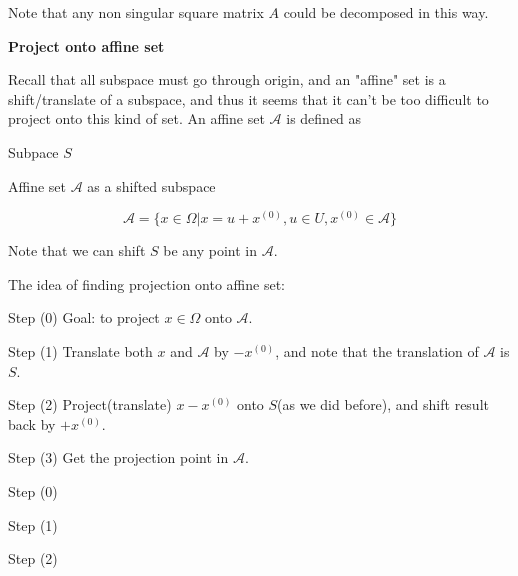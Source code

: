 Note that any non singular square matrix $A$ could be decomposed in this way.

\vspace{0.5cm}
\textbf{Project onto affine set}

Recall that all subspace must go through origin, and an "affine" set is a shift/translate of a subspace, and thus it seems that it can't be too difficult to project onto this kind of set. An affine set $\mathcal{A}$ is defined as

\begin{marginfigure}
	\centering
	\resizebox{7.5cm}{3cm}{}
	\caption{Subpace $S$}
	\label{}
\end{marginfigure}

\begin{marginfigure}
	\centering
	\resizebox{7.5cm}{3cm}{}
	\caption{Affine set $\mathcal{A}$ as a shifted subspace}
	\label{}
\end{marginfigure}

$$\mathcal{A}=\{x\in\Omega|x=u+x^{(0)}, u\in U, x^{(0)}\in \mathcal{A}\}$$

Note that we can shift $S$ be any point in $\mathcal{A}$.

\vspace{0.3cm}
The idea of finding projection onto affine set:

Step (0) Goal: to project $x\in \Omega$ onto $\mathcal{A}$.

Step (1) Translate both $x$ and $\mathcal{A}$ by $-x^{(0)}$, and note that the translation of $\mathcal{A}$ is $S$.

Step (2) Project(translate) $x-x^{(0)}$ onto $S$(as we did before), and shift result back by $+x^{(0)}$.

Step (3) Get the projection point in $\mathcal{A}$.

\begin{marginfigure}
	\centering
	\resizebox{7.5cm}{3cm}{}
	\caption{Step (0)}
	\label{}
\end{marginfigure}

\begin{marginfigure}
	\centering
	\resizebox{7.5cm}{3cm}{}
	\caption{Step (1)}
	\label{}
\end{marginfigure}

\begin{marginfigure}
	\centering
	\resizebox{7.5cm}{3cm}{}
	\caption{Step (2)}
	\label{}
\end{marginfigure}

